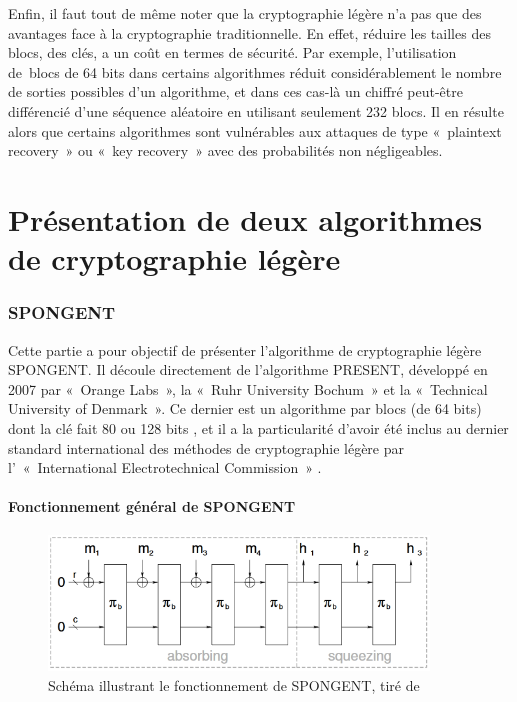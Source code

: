 			Enfin, il faut tout de même noter que la cryptographie légère n’a pas que des
		avantages face à la cryptographie traditionnelle. En effet, réduire les
		tailles des blocs, des clés, a un coût en termes de sécurité. Par exemple,
		l’utilisation de blocs de 64 bits dans certains algorithmes réduit
		considérablement le nombre de sorties possibles d’un algorithme, et dans ces
		cas-là un chiffré peut-être différencié d’une séquence aléatoire en utilisant
		seulement 232 blocs. Il en résulte alors que certains algorithmes sont
		vulnérables aux attaques de type « plaintext recovery » ou « key recovery »
		avec des probabilités non négligeables.

\newpage
\part{Présentation de deux algorithmes de cryptographie légère}

	\section{SPONGENT}

			Cette partie a pour objectif de présenter l’algorithme de cryptographie légère
		SPONGENT. Il découle directement de l’algorithme PRESENT, développé en 2007
		par « Orange Labs », la « Ruhr University Bochum » et la « Technical
		University of Denmark ». Ce dernier est un algorithme par blocs (de 64 bits)
		dont la clé fait 80 ou 128 bits \cite{PRESENT}, et il a la particularité
		d’avoir été inclus au dernier standard international des méthodes de
		cryptographie légère par l’ « International Electrotechnical Commission »
		\cite{ultraLightURL}.

		\subsection{Fonctionnement général de SPONGENT}

			\begin{figure}[!h]
				 	\centering
				 	\includegraphics[width=0.9\textwidth]{imgs/Spongent/fctGlobalSpongent.png}
				 	\caption{Schéma illustrant le fonctionnement de SPONGENT, tiré de \cite{6275435}}
				 	\label{fctGlobalSpongent}
			\end{figure}

